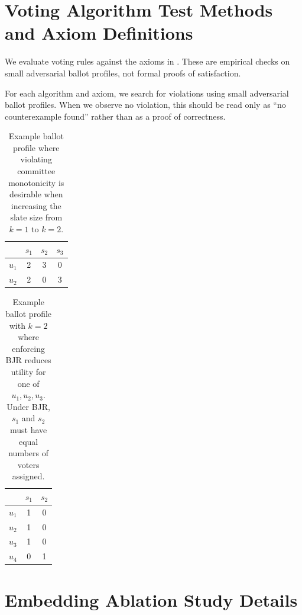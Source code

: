 \documentclass[11pt]{article}
\begin{document}


\newpage
\appendix

\section{Voting Algorithm Test Methods and Axiom Definitions}
\label{app:voting-test-methods}

We evaluate voting rules against the axioms in . These are empirical checks on small adversarial ballot profiles, not formal proofs of satisfaction.

For each algorithm and axiom, we search for violations using small adversarial ballot profiles. When we observe no violation, this should be read only as ``no counterexample found'' rather than as a proof of correctness.

\begin{table}[t]
\centering
\begin{tabular}{lccc}
\hline
 & $s_1$ & $s_2$ & $s_3$ \\
\hline
$u_1$ & 2 & 3 & 0 \\
$u_2$ & 2 & 0 & 3 \\
\hline
\end{tabular}
\caption{Example ballot profile where violating committee monotonicity is desirable when increasing the slate size from \(k=1\) to \(k=2\).}
\label{tab:committee-monotonicity-example}
\end{table}

\begin{table}[t]
\centering
\begin{tabular}{lcc}
\hline
 & $s_1$ & $s_2$ \\
\hline
$u_1$ & 1 & 0 \\
$u_2$ & 1 & 0 \\
$u_3$ & 1 & 0 \\
$u_4$ & 0 & 1 \\
\hline
\end{tabular}
\caption{Example ballot profile with \(k=2\) where enforcing BJR reduces utility for one of \(u_1,u_2,u_3\). Under BJR, \(s_1\) and \(s_2\) must have equal numbers of voters assigned.}
\label{tab:bjr-example}
\end{table}

\section{Embedding Ablation Study Details}
\label{app:embedding-ablation-details}
\end{document}
